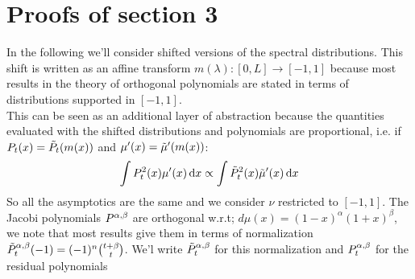 \documentclass{article}
\begin{document}
\section{Proofs of section 3}
In the following we'll consider shifted versions of the spectral distributions. This shift is written as an affine transform $m(\lambda):[0,L]\rightarrow [-1,1]$ because most results in the theory of orthogonal polynomials are stated in terms of distributions supported in $[-1,1]$. \\
This can be seen as an additional layer of abstraction because the quantities evaluated with the shifted distributions and polynomials are proportional, i.e. if $P_t(x)=\Tilde{P}_t(m(x))$ and $\mu'(x)=\Tilde{\mu}'(m(x))$:
\begin{equation}
    \int P_t^2(x)\mu'(x)\mathop{}\!\mathrm{d} x\propto \int \Tilde{P}_t^2(x)\Tilde{\mu}'(x)\mathop{}\!\mathrm{d} x
\end{equation}
So all the asymptotics are the same and we consider $\nu$ restricted to $[-1,1]$. 
The Jacobi polynomials $P^{\alpha,\beta}$ are orthogonal w.r.t; $d\mu(x)=(1-x)^\alpha(1+x)^\beta$, we note that most results give them in terms of normalization $\Tilde{P}_t^{\alpha,\beta}(-1)=(-1)^n\binom{t+\beta}{t}$. We'l write $\Tilde{P}^{\alpha,\beta}_t$ for this normalization and $P^{\alpha,\beta}_t$ for the residual polynomials
\robustjacobi*
\end{document}
